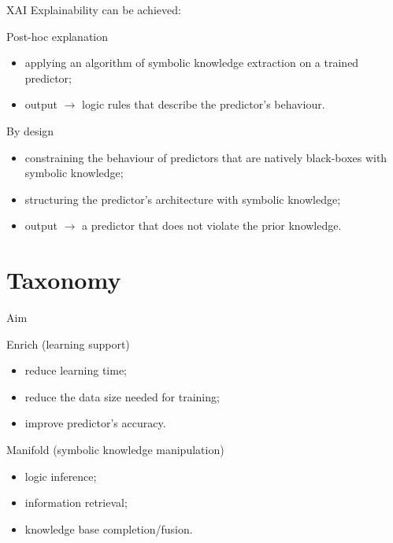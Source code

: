\documentclass[presentation]{beamer}\mode<presentation>{\usetheme{AMSBolognaFC}}
\begin{document}
\begin{frame}[c]{XAI}
    Explainability can be achieved:
    \begin{block}{Post-hoc explanation}
        \begin{itemize}
            \item applying an algorithm of symbolic knowledge extraction on a trained predictor;
            \item output $\rightarrow$ logic rules that describe the predictor's behaviour.
        \end{itemize}    
    \end{block}
    
    \begin{block}{By design}
        \begin{itemize}
            \item constraining the behaviour of predictors that are natively black-boxes with symbolic knowledge;
            \item structuring the predictor's architecture with symbolic knowledge;
            \item output $\rightarrow$ a predictor that does not violate the prior knowledge.
        \end{itemize}
    \end{block}
    
\end{frame}




\section{Taxonomy}

\begin{frame}[c]{Aim}
    \begin{block}{Enrich (learning support)}
        \begin{itemize}
            \item reduce learning time;
            \item reduce the data size needed for training;
            \item improve predictor's accuracy.
        \end{itemize}
    \end{block}
    \begin{block}{Manifold (symbolic knowledge manipulation)}
        \begin{itemize}
            \item logic inference;
            \item information retrieval;
            \item knowledge base completion/fusion.
        \end{itemize}
    \end{block}
\end{frame}
\end{document}
